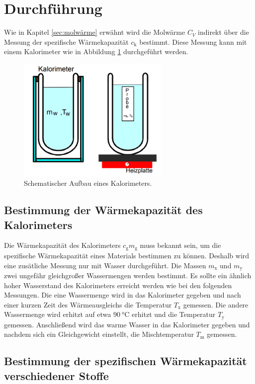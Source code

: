 \section{Durchführung}
\label{sec:Durchführung}

Wie in Kapitel \ref{sec:molwärme} erwähnt wird die Molwärme $C_V$ indirekt über die Messung der spezifische Wärmekapazität $c_\text{k}$ bestimmt.
Diese Messung kann mit einem Kalorimeter wie in Abbildung \ref{fig:abb1} durchgeführt werden.
\begin{figure}
\centering
\includegraphics[height=6.0cm]{data/abb1.png}
\caption{Schematischer Aufbau eines Kalorimeters. \cite{V201}}
\label{fig:abb1}
\end{figure}

\subsection{Bestimmung der Wärmekapazität des Kalorimeters}
\label{sec:Durchführung_Kalo}

Die Wärmekapazität des Kalorimeters $c_\text{g} m_\text{g}$ muss bekannt sein, um die spezifische Wärmekapazität eines Materials bestimmen zu können.
Deshalb wird eine zusätliche Messung nur mit Wasser durchgeführt.
Die Massen $m_\text{x}$ und $m_\text{y}$ zwei ungefähr gleichgroßer Wassermengen werden bestimmt.
Es sollte ein ähnlich hoher Wasserstand des Kalorimeters erreicht werden wie bei den folgenden Messungen.
Die eine Wassermenge wird in das Kalorimeter gegeben und nach einer kurzen Zeit des Wärmeausgleichs die Temperatur $T_\text{x}$ gemessen.
Die andere Wassermenge wird erhitzt auf etwa $\SI{90}{\celsius}$ erhitzt und die Temperatur $T_\text{y}$ gemessen.
Anschließend wird das warme Wasser in das Kalorimeter gegeben und nachdem sich ein Gleichgewicht einstellt, die Mischtemperatur $T_\text{m}$ gemessen.

\subsection{Bestimmung der spezifischen Wärmekapazität verschiedener Stoffe}
\label{sec:Durchführung_Stoffe}

